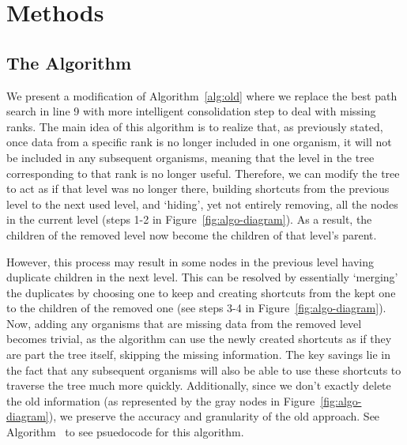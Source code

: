 \section{Methods} \label{sec:methods}





\subsection{The Algorithm} \label{sec:algorithm}

We present a modification of Algorithm~\ref{alg:old} where we replace the best path search in line 9 with more intelligent consolidation step to deal with missing ranks. The main idea of this algorithm is to realize that, as previously stated, once data from a specific rank is no longer included in one organism, it will not be included in any subsequent organisms, meaning that the level in the tree corresponding to that rank is no longer useful. Therefore, we can modify the tree to act as if that level was no longer there, building shortcuts from the previous level to the next used level, and `hiding', yet not entirely removing, all the nodes in the current level (steps 1-2 in Figure~\ref{fig:algo-diagram}). As a result, the children of the removed level now become the children of that level's parent. 



However, this process may result in some nodes in the previous level having duplicate children in the next level. This can be resolved by essentially `merging' the duplicates by choosing one to keep and creating shortcuts from the kept one to the children of the removed one (see steps 3-4 in Figure~\ref{fig:algo-diagram}). Now, adding any organisms that are missing data from the removed level becomes trivial, as the algorithm can use the newly created shortcuts as if they are part the tree itself, skipping the missing information. The key savings lie in the fact that any subsequent organisms will also be able to use these shortcuts to traverse the tree much more quickly. Additionally, since we don't exactly delete the old information (as represented by the gray nodes in Figure~\ref{fig:algo-diagram}), we preserve the accuracy and granularity of the old approach. See Algorithm~ to see psuedocode for this algorithm.



